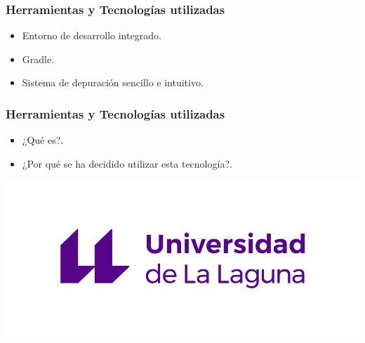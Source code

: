 \begin{frame}
	\frametitle{Herramientas y Tecnologías utilizadas}
		\begin{itemize}
			\item Entorno de desarrollo integrado.
			\item Gradle.
			\item Sistema de depuración sencillo e intuitivo.
		\end{itemize}
	\endblock{}
\end{frame}


\begin{frame}
	\frametitle{Herramientas y Tecnologías utilizadas}
			\begin{itemize}
				\item {¿Qué es?}.
				\item {¿Por qué se ha decidido utilizar esta tecnología?}.
			\end{itemize}
		\endblock{}
			\begin{center}
				\includegraphics[width=0.72\linewidth]{img/marca-universidad-de-la-laguna-original}
			\end{center}
\end{frame}

